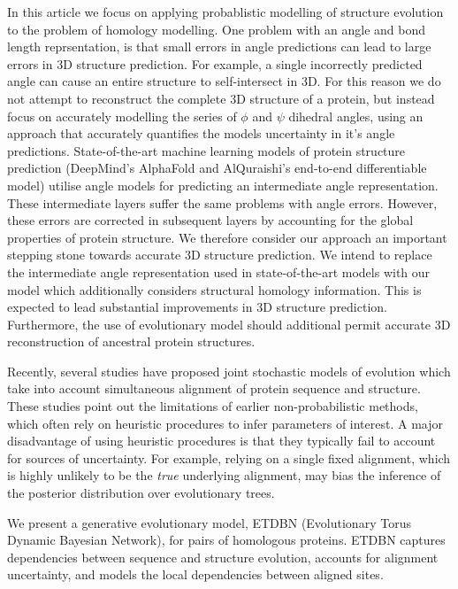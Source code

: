 \documentclass[nogrid]{MBE}%
\begin{document}
In this article we focus on applying probablistic modelling of structure evolution to the problem of homology modelling. One problem with an angle and bond length reprsentation, is that small errors in angle predictions can lead to large errors in 3D structure prediction. For example, a single incorrectly predicted angle can cause an entire structure to self-intersect in 3D. For this reason we do not attempt to reconstruct the complete 3D structure of a protein, but instead focus on accurately modelling the series of $\phi$ and $\psi$ dihedral angles, using an approach that accurately quantifies the models uncertainty in it's angle predictions. State-of-the-art machine learning models of protein structure prediction (DeepMind's AlphaFold and AlQuraishi's end-to-end differentiable model) utilise angle models for predicting an intermediate angle representation. These intermediate layers suffer the same problems with angle errors. However, these errors are corrected in subsequent layers by accounting for the global properties of protein structure. We therefore consider our approach an important stepping stone towards accurate 3D structure prediction. We intend to replace the intermediate angle representation used in state-of-the-art models with our model which additionally considers structural homology information. This is expected to lead substantial improvements in 3D structure prediction. Furthermore, the use of evolutionary model should additional permit accurate 3D reconstruction of ancestral protein structures.

\iffalse
Recently, several studies \citep{challis2012stochastic, herman2014simultaneous} have proposed joint stochastic models of evolution which take into account simultaneous alignment of protein sequence and structure. These studies point out the limitations of earlier non-probabilistic methods, which often rely on heuristic procedures to infer parameters of interest. A major disadvantage of using heuristic procedures is that they typically fail to account for sources of uncertainty. For example, relying on a single fixed alignment, which is highly unlikely to be the \textit{true} underlying alignment, may bias the inference of the posterior distribution over evolutionary trees.

We present a generative evolutionary model, ETDBN (Evolutionary Torus Dynamic Bayesian Network), for pairs of homologous proteins. ETDBN captures dependencies between sequence and structure evolution, accounts for alignment uncertainty, and models the local dependencies between aligned sites.
\end{document}
